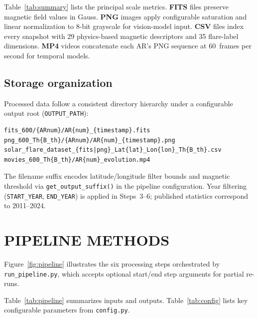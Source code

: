 \documentclass[]{spie}
\begin{document}
Table~\ref{tab:summary} lists the principal scale metrics. \textbf{FITS} files preserve magnetic field values in Gauss. \textbf{PNG} images apply configurable saturation and linear normalization to 8-bit grayscale for vision-model input. \textbf{CSV} files index every snapshot with 29 physics-based magnetic descriptors and 35 flare-label dimensions. \textbf{MP4} videos concatenate each AR's PNG sequence at 60~frames per second for temporal models.

\subsection{Storage organization}

Processed data follow a consistent directory hierarchy under a configurable output root (\texttt{OUTPUT\_PATH}):
\begin{verbatim}
fits_600/{ARnum}/AR{num}_{timestamp}.fits
png_600_Th{B_th}/{ARnum}/AR{num}_{timestamp}.png
solar_flare_dataset_{fits|png}_Lat{lat}_Lon{lon}_Th{B_th}.csv
movies_600_Th{B_th}/AR{num}_evolution.mp4
\end{verbatim}
The filename suffix encodes latitude/longitude filter bounds and magnetic threshold via \texttt{get\_output\_suffix()} in the pipeline configuration. Year filtering (\texttt{START\_YEAR}, \texttt{END\_YEAR}) is applied in Steps~3--6; published statistics correspond to 2011--2024.

\section{PIPELINE METHODS}
\label{sec:pipeline}

Figure~\ref{fig:pipeline} illustrates the six processing steps orchestrated by \texttt{run\_pipeline.py}, which accepts optional start/end step arguments for partial re-runs.



Table~\ref{tab:pipeline} summarizes inputs and outputs. Table~\ref{tab:config} lists key configurable parameters from \texttt{config.py}.
\end{document}
